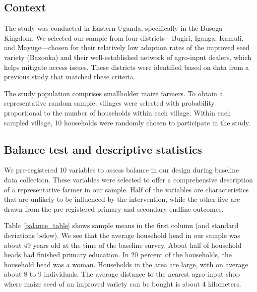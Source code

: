 \documentclass[english]{article}\usepackage[]{graphicx}\usepackage[]{xcolor}
\begin{document}
\subsection{Context}

The study was conducted in Eastern Uganda, specifically in the Busoga
Kingdom. We selected our sample from four districts---Bugiri, Iganga,
Kamuli, and Mayuge---chosen for their relatively low adoption rates
of the improved seed variety (Bazooka) and their well-established
network of agro-input dealers, which helps mitigate access issues.
These districts were identified based on data from a previous study
that matched these criteria.

The study population comprises smallholder maize farmers. To obtain
a representative random sample, villages were selected with probability
proportional to the number of households within each village. Within
each sampled village, 10 households were randomly chosen to participate
in the study.



\subsection{Balance test and descriptive statistics}

We pre-registered 10 variables to assess balance in our design during
baseline data collection. These variables were selected to offer a
comprehensive description of a representative farmer in our sample.
Half of the variables are characteristics that are unlikely to be
influenced by the intervention, while the other five are drawn from
the pre-registered primary and secondary endline outcomes.

Table \ref{balance_table} shows sample means in the first column
(and standard deviations below). We see that the average household
head in our sample was about 49
years old at the time of the baseline survey. About half of household
heads had finished primary education. In 20 percent of the households,
the household head was a woman. Households in the area are large,
with on average about 8 to 9 individuals. The average distance to
the nearest agro-input shop where maize seed of an improved variety
can be bought is about 4 kilometers.
\end{document}
